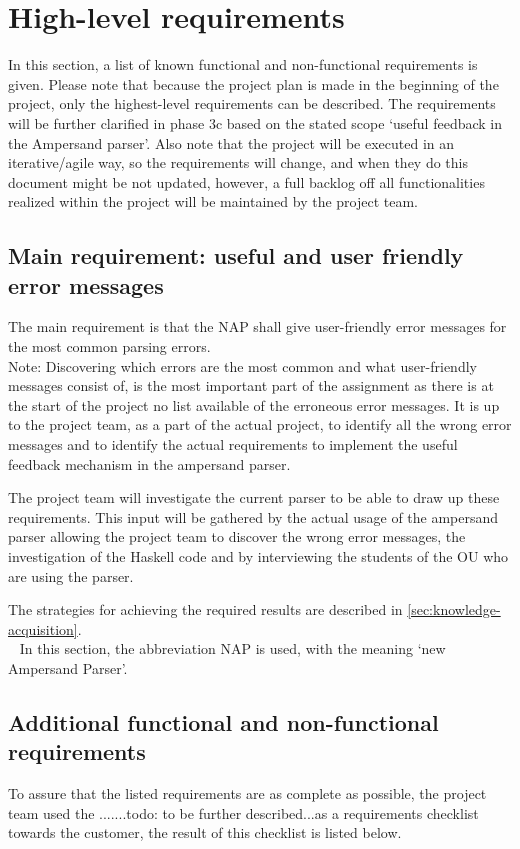 \section{High-level requirements}
\label{sec:requirements}
In this section, a list of known functional and non-functional requirements is given.
Please note that because the project plan is made in the beginning of the project, only the highest-level requirements can be described.
The requirements will be further clarified in phase 3c based on the stated scope `useful feedback in the Ampersand parser'.
Also note that the project will be executed in an iterative/agile way, so the requirements will change, and when they do this document might be not updated, however, a full backlog off all functionalities realized within the project will be maintained by the project team.

\subsection{Main requirement: useful and user friendly error messages}
	The main requirement is that the NAP shall give user-friendly error messages for the most common parsing errors.\\
	Note: Discovering which errors are the most common and what user-friendly messages consist of, is the most important part of the assignment as there is at the start of the project no list available of the erroneous error messages.
	It is up to the project team, as a part of the actual project, to identify all the wrong error messages and to identify the actual requirements to implement the useful feedback mechanism in the ampersand parser.
	
	The project team will investigate the current parser to be able to draw up these requirements.
	This input will be gathered by the actual usage of the ampersand parser allowing the project team to discover the wrong error messages, the investigation of the Haskell code and by interviewing the students of the OU who are using the parser.
	
	The strategies for achieving the required results are described in \autoref{sec:knowledge-acquisition}.\\

~\newline\noindent
In this section, the abbreviation NAP is used, with the meaning `new Ampersand Parser'.
%

\subsection{Additional functional and non-functional requirements}
To assure that the listed requirements are as complete as possible, the project team used the .......todo: to be further described...as a requirements checklist towards the customer, the result of this checklist is listed below.

